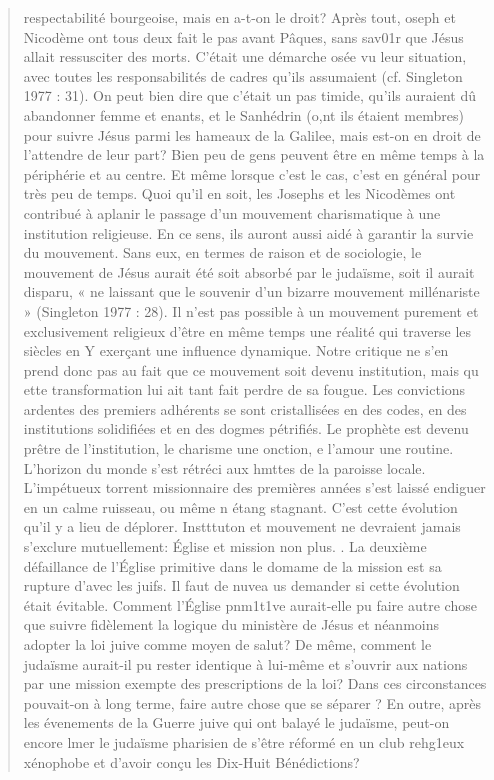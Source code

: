 \begin{quote}
    respectabilité bourgeoise, mais en a-t-on le droit? Après tout, oseph
et Nicodème ont tous deux fait le pas avant Pâques, sans sav01r que
Jésus allait ressusciter des morts. C'était une démarche osée vu leur
situation, avec toutes les responsabilités de cadres qu'ils assumaient
(cf. Singleton 1977 : 31). On peut bien dire que c'était un pas timide,
qu'ils auraient dû abandonner femme et enants, et le Sanhédrin (o,nt
ils étaient membres) pour suivre Jésus parmi les hameaux de la Galilee,
mais est-on en droit de l'attendre de leur part? Bien peu de gens
peuvent être en même temps à la périphérie et au centre. Et même
lorsque c'est le cas, c'est en général pour très peu de temps.
Quoi qu'il en soit, les Josephs et les Nicodèmes ont contribué à
aplanir le passage d'un mouvement charismatique à une institution
religieuse. En ce sens, ils auront aussi aidé à garantir la survie du
mouvement. Sans eux, en termes de raison et de sociologie, le
mouvement de Jésus aurait été soit absorbé par le judaïsme, soit il
aurait disparu, « ne laissant que le souvenir d'un bizarre mouvement
millénariste » (Singleton 1977 : 28).
Il n'est pas possible à un mouvement purement et exclusivement
religieux d'être en même temps une réalité qui traverse les siècles en Y
exerçant une influence dynamique. Notre critique ne s'en prend donc
pas au fait que ce mouvement soit devenu institution, mais qu ette
transformation lui ait tant fait perdre de sa fougue. Les convictions
ardentes des premiers adhérents se sont cristallisées en des codes, en
des institutions solidifiées et en des dogmes pétrifiés. Le prophète est
devenu prêtre de l'institution, le charisme une onction, e l'amour
une routine. L'horizon du monde s'est rétréci aux hmttes de la
paroisse locale. L'impétueux torrent missionnaire des premières
années s'est laissé endiguer en un calme ruisseau, ou même n étang
stagnant. C'est cette évolution qu'il y a lieu de déplorer. Instttuton et
mouvement ne devraient jamais s'exclure mutuellement: Église et
mission non plus. .
La deuxième défaillance de l'Église primitive dans le domame de
la mission est sa rupture d'avec les juifs. Il faut de nuvea us
demander si cette évolution était évitable. Comment l'Église pnm1t1ve
aurait-elle pu faire autre chose que suivre fidèlement la logique du
ministère de Jésus et néanmoins adopter la loi juive comme moyen de
salut? De même, comment le judaïsme aurait-il pu rester identique à
lui-même et s'ouvrir aux nations par une mission exempte des
prescriptions de la loi? Dans ces circonstances pouvait-on à long
terme, faire autre chose que se séparer ? En outre, après les évenements
de la Guerre juive qui ont balayé le judaïsme, peut-on encore lmer
le judaïsme pharisien de s'être réformé en un club rehg1eux
xénophobe et d'avoir conçu les Dix-Huit Bénédictions?
\end{quote}

